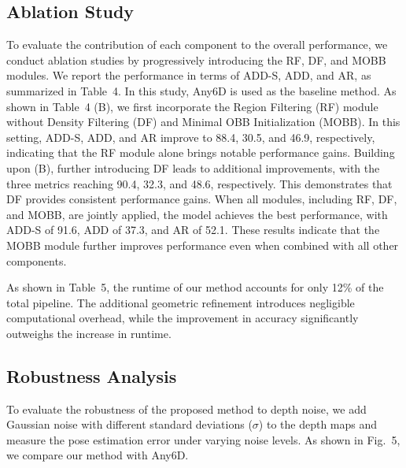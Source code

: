 \documentclass[letterpaper, 10 pt, journal, twoside]{IEEEtran}  %
\begin{document}
\subsection{Ablation Study}
To evaluate the contribution of each component to the overall performance, we conduct ablation studies by progressively introducing the RF, DF, and MOBB modules. 
We report the performance in terms of ADD-S, ADD, and AR, as summarized in Table~4. 
In this study, Any6D is used as the baseline method.
As shown in Table~4 (B), we first incorporate the Region Filtering (RF) module without Density Filtering (DF) and Minimal OBB Initialization (MOBB). 
In this setting, ADD-S, ADD, and AR improve to 88.4, 30.5, and 46.9, respectively, indicating that the RF module alone brings notable performance gains.
Building upon (B), further introducing DF leads to additional improvements, with the three metrics reaching 90.4, 32.3, and 48.6, respectively. 
This demonstrates that DF provides consistent performance gains.
When all modules, including RF, DF, and MOBB, are jointly applied, the model achieves the best performance, with ADD-S of 91.6, ADD of 37.3, and AR of 52.1. 
These results indicate that the MOBB module further improves performance even when combined with all other components.

As shown in Table~5, the runtime of our method accounts for only 12\% of the total pipeline. 
The additional geometric refinement introduces negligible computational overhead, while the improvement in accuracy significantly outweighs the increase in runtime.
\begin{table}[htbp]
	\caption{Efficiency at each stage.}
	\centering
	\label{stage_time}
\end{table}
\subsection{Robustness Analysis}
To evaluate the robustness of the proposed method to depth noise, we add Gaussian noise with different standard deviations ($\sigma$) to the depth maps and measure the pose estimation error under varying noise levels. 
As shown in Fig.~5, we compare our method with Any6D.
\end{document}
